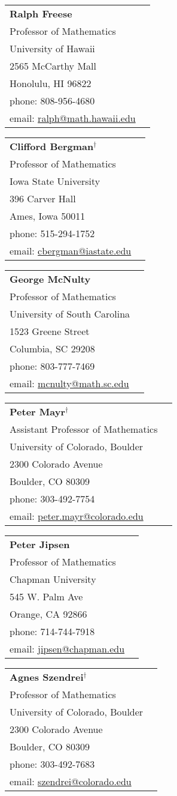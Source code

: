 
\newcommand\referee[7]{\textbf{#1} \\ #2  \\#3  \\#4  \\#5 \\phone: #6 \\ email: \url{#7}}


    \begin{tabular}{@{}p{6cm}p{6cm}}
      \referee
          {Ralph Freese}
          {Professor of Mathematics}
          {University of Hawaii}
          {2565 McCarthy Mall}
          {Honolulu, HI 96822}
          {808-956-4680}
          {ralph@math.hawaii.edu}
    \end{tabular}
    \begin{tabular}{@{}p{6cm}p{6cm}}
      \referee
          {Clifford Bergman$^\dag$}
          {Professor of Mathematics}
          {Iowa State University}
          {396 Carver Hall}
          {Ames, Iowa 50011}
          {515-294-1752}
          {cbergman@iastate.edu}
    \end{tabular}


    \begin{tabular}{@{}p{6cm}p{6cm}}
      \referee
          {George McNulty}
          {Professor of Mathematics}
          {University of South Carolina}
          {1523 Greene Street}
          {Columbia, SC 29208}
          {803-777-7469}
          {mcnulty@math.sc.edu}
    \end{tabular}
    \begin{tabular}{@{}p{6cm}p{6cm}}
      \referee
          {Peter Mayr$^\dag$}
          {Assistant Professor of Mathematics}
          {University of Colorado, Boulder}
          {2300 Colorado Avenue}
          {Boulder, CO 80309}
          {303-492-7754} 
          {peter.mayr@colorado.edu}
    \end{tabular}


    \begin{tabular}{@{}p{6cm}p{6cm}}
      \referee
          {Peter Jipsen}
          {Professor of Mathematics}
          {Chapman University}
          {545 W. Palm Ave}
          {Orange, CA 92866}
          {714-744-7918}
          {jipsen@chapman.edu}
    \end{tabular}
    \begin{tabular}{@{}p{6cm}p{6cm}}
          \referee
              {Agnes Szendrei$^\dag$}
              {Professor of Mathematics}
              {University of Colorado, Boulder}
              {2300 Colorado Avenue}
              {Boulder, CO 80309}
              {303-492-7683}
              {szendrei@colorado.edu}
    \end{tabular}

